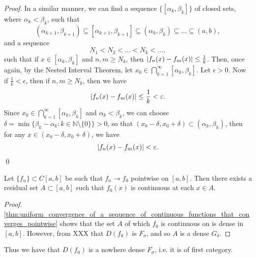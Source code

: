 \documentclass[notoc,notitlepage]{tufte-book}
\begin{document}
\begin{proof}
  In a similar manner, we can find a sequence $\{ [ \alpha_k, \beta_k  ] \}$ of closed sets, where $\alpha_k < \beta_k$, such that
  \begin{equation*}
    ( \alpha_{k + 1}, \beta_{k + 1} ) \subseteq [ \alpha_{k + 1}, \beta_{k + 1} ] \subseteq (\alpha_k, \beta_k) \subseteq \hdots \subseteq (a, b),
  \end{equation*}
  and a sequence
  \begin{equation*}
    N_1 < N_2 < \hdots < N_k < \hdots,
  \end{equation*}
  such that if $x \in [ \alpha_k, \beta_k ]$ and $n, m \geq N_k$, then $\left| f_n(x) - f_m(x) \right| \leq \frac{1}{k}$. Then, once again, by the Nested Interval Theorem, let $x_0 \in \bigcap_{k=1}^{\infty} [\alpha_k, \beta_k]$. Let $\epsilon > 0$. Now if $\frac{1}{k} < \epsilon$, then if $n, m \geq N_k$, then we have
  \begin{equation*}
    \left| f_n(x) - f_m(x) \right| \leq \frac{1}{k} < \varepsilon.
  \end{equation*}
  Since $x_0 \in \bigcap_{k=1}^{\infty} [ \alpha_k, \beta_k ]$ and $\alpha_k < \beta_k$, we can choose $\delta = \min \{ \beta_k - \alpha_k : k \in \mathbb{N} \setminus \{ 0 \} \} > 0$, so that $(x_0 - \delta, x_0 + \delta) \subset (\alpha_k, \beta_k)$, then for any $x \in (x_0 - \delta, x_0 + \delta)$, we have
  \begin{equation*}
    \left| f_n(x) - f_m(x) \right| < \varepsilon.
  \end{equation*}\qed\
\end{proof}

\begin{crly}\label{crly:continuity_of_the_limit_of_a_sequence_of_pointwise_convergent_functions_on_a_residual_set}
  Let $\{ f_n \} \subset C[a, b]$ be such that $f_n \to f_0$ pointwise on $[a, b]$. Then there exists a residual set $A \subset [a, b]$ such that $f_0(x)$ is continuous at each $x \in A$.
\end{crly}

\begin{proof}
  \cref{thm:uniform_convergence_of_a_sequence_of_continuous_functions_that_converges_pointwise} shows that the set $A$ of which $f_0$ is continuous on is dense in $[a, b]$. However, from XXX that $D(f_0)$ is $F_\sigma$, and so $A$ is a dense $G_\delta$.
\end{proof}

\begin{remark}
  Thus we have that $D(f_0)$ is a nowhere dense $F_\sigma$, i.e. it is of first category.
\end{remark}
\end{document}
